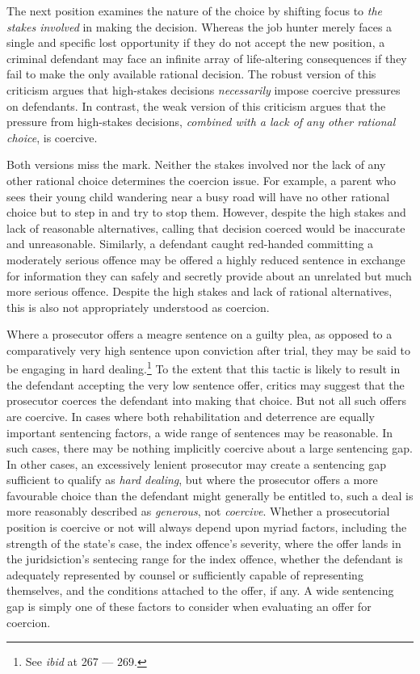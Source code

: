 The next position examines the nature of the choice by shifting focus to \textit{the stakes involved} in making the decision. Whereas the job hunter merely faces a single and specific lost opportunity if they do not accept the new position, a criminal defendant may face an infinite array of life-altering consequences if they fail to make the only available rational decision. The robust version of this criticism argues that high-stakes decisions \textit{necessarily} impose coercive pressures on defendants. In contrast, the weak version of this criticism argues that the pressure from high-stakes decisions, \textit{combined with a lack of any other rational choice}, is coercive. 

Both versions miss the mark. Neither the stakes involved nor the lack of any other rational choice determines the coercion issue. For example, a parent who sees their young child wandering near a busy road will have no other rational choice but to step in and try to stop them. However, despite the high stakes and lack of reasonable alternatives, calling that decision coerced would be inaccurate and unreasonable. Similarly, a defendant caught red-handed committing a moderately serious offence may be offered a highly reduced sentence in exchange for information they can safely and secretly provide about an unrelated but much more serious offence. Despite the high stakes and lack of rational alternatives, this is also not appropriately understood as coercion.

Where a prosecutor offers a meagre sentence on a guilty plea, as opposed to a comparatively very high sentence upon conviction after trial, they may be said to be engaging in hard dealing.\footnote{See \textit{ibid} at 267 — 269.} To the extent that this tactic is likely to result in the defendant accepting the very low sentence offer, critics may suggest that the prosecutor coerces the defendant into making that choice. But not all such offers are coercive. In cases where both rehabilitation and deterrence are equally important sentencing factors, a wide range of sentences may be reasonable. In such cases, there may be nothing implicitly coercive about a large sentencing gap. In other cases, an excessively lenient prosecutor may create a sentencing gap sufficient to qualify as \textit{hard dealing}, but where the prosecutor offers a more favourable choice than the defendant might generally be entitled to, such a deal is more reasonably described as \textit{generous}, not \textit{coercive}. Whether a prosecutorial position is coercive or not will always depend upon myriad factors, including the strength of the state's case, the index offence's severity, where the offer lands in the juridsiction's sentecing range for the index offence, whether the defendant is adequately represented by counsel or sufficiently capable of representing themselves, and the conditions attached to the offer, if any. A wide sentencing gap is simply one of these factors to consider when evaluating an offer for coercion.

